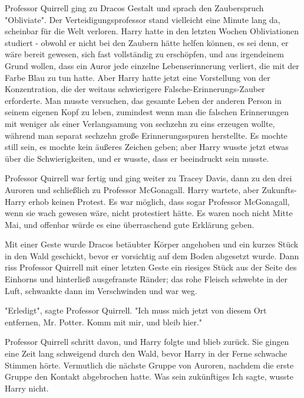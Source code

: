 {Professor Quirrell ging zu Dracos Gestalt und sprach den Zauberspruch "Obliviate". Der Verteidigungsprofessor stand vielleicht eine Minute lang da, scheinbar für die Welt verloren. Harry hatte in den letzten Wochen Obliviationen studiert - obwohl er nicht bei den Zaubern hätte helfen können, es sei denn, er wäre bereit gewesen, sich fast vollständig zu erschöpfen, und aus irgendeinem Grund wollen, dass ein Auror jede einzelne Lebenserinnerung verliert, die mit der Farbe Blau zu tun hatte. Aber Harry hatte jetzt eine Vorstellung von der Konzentration, die der weitaus schwierigere Falsche-Erinnerungs-Zauber erforderte. Man musste versuchen, das gesamte Leben der anderen Person in seinem eigenen Kopf zu leben, zumindest wenn man die falschen Erinnerungen mit weniger als einer Verlangsamung von sechzehn zu eins erzeugen wollte, während man separat sechzehn große Erinnerungsspuren herstellte. Es mochte still sein, es mochte kein äußeres Zeichen geben; aber Harry wusste jetzt etwas über die Schwierigkeiten, und er wusste, dass er beeindruckt sein musste.

Professor Quirrell war fertig und ging weiter zu Tracey Davis, dann zu den drei Auroren und schließlich zu Professor McGonagall. Harry wartete, aber Zukunfts-Harry erhob keinen Protest. Es war möglich, dass sogar Professor McGonagall, wenn sie wach gewesen wäre, nicht protestiert hätte. Es waren noch nicht Mitte Mai, und offenbar würde es eine überraschend gute Erklärung geben.

Mit einer Geste wurde Dracos betäubter Körper angehoben und ein kurzes Stück in den Wald geschickt, bevor er vorsichtig auf dem Boden abgesetzt wurde. Dann riss Professor Quirrell mit einer letzten Geste ein riesiges Stück aus der Seite des Einhorns und hinterließ ausgefranste Ränder; das rohe Fleisch schwebte in der Luft, schwankte dann im Verschwinden und war weg.

"Erledigt", sagte Professor Quirrell. "Ich muss mich jetzt von diesem Ort entfernen, Mr. Potter. Komm mit mir, und bleib hier."

Professor Quirrell schritt davon, und Harry folgte und blieb zurück. Sie gingen eine Zeit lang schweigend durch den Wald, bevor Harry in der Ferne schwache Stimmen hörte. Vermutlich die nächste Gruppe von Auroren, nachdem die erste Gruppe den Kontakt abgebrochen hatte. Was sein zukünftiges Ich sagte, wusste Harry nicht.

}
